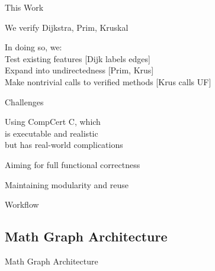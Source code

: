 \documentclass[usenames, xcolor=dvipsnames]{beamer}
\begin{document}
\begin{frame}{This Work}
\bigskip

We verify Dijkstra, Prim, Kruskal

\bigskip \pause

In doing so, we:
\\ \hspace{1em} Test existing features [Dijk labels edges]
\\ \hspace{1em} Expand into undirectedness [Prim, Krus]
\\ \hspace{1em} Make nontrivial calls to verified methods [Krus calls UF]

\end{frame}

\begin{frame}{Challenges}

Using CompCert C, which 
\\ \hspace{1em} is executable and realistic 
\\ \hspace{1em} but has real-world complications

\bigskip

Aiming for full functional correctness

\bigskip

Maintaining modularity and reuse
\end{frame}

\begin{frame}{Workflow}
  
\end{frame}


\subsection{Math Graph Architecture}
\begin{frame}{Math Graph Architecture}
  \centering
  \colorbox{lightg}{}
\end{frame}
\end{document}
